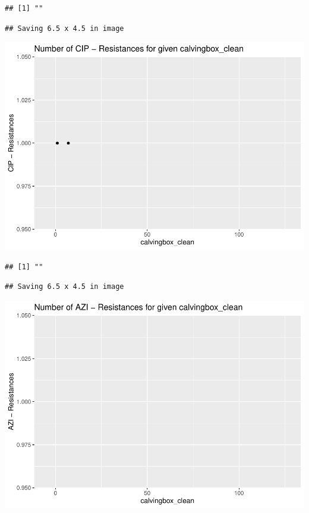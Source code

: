 \documentclass[
]{article}
\begin{document}
\begin{verbatim}
## [1] ""
\end{verbatim}

\begin{verbatim}
## Saving 6.5 x 4.5 in image
\end{verbatim}

\includegraphics{NResistenzen_files/figure-latex/numerical_variables-22.pdf}

\begin{verbatim}
## [1] ""
\end{verbatim}

\begin{verbatim}
## Saving 6.5 x 4.5 in image
\end{verbatim}

\includegraphics{NResistenzen_files/figure-latex/numerical_variables-23.pdf}
\end{document}
